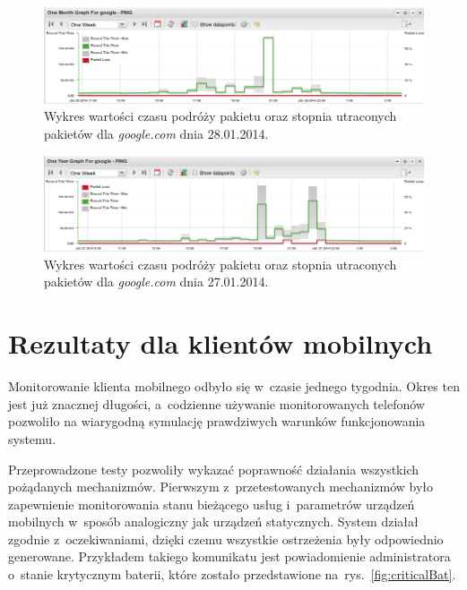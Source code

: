 \begin{figure}[H]
  \caption{Wykres wartości czasu podróży pakietu oraz stopnia
    utraconych pakietów dla {\em google.com} dnia 28.01.2014.}
  \label{fig:google2801}
  \centering
\includegraphics[width=1\textwidth]{img/google2801.png}
\end{figure}

\begin{figure}[H]
  \caption{Wykres wartości czasu podróży pakietu oraz stopnia
    utraconych pakietów dla {\em google.com} dnia 27.01.2014.}
  \label{fig:google2701}
  \centering
\includegraphics[width=1\textwidth]{img/google2701.png}
\end{figure}


\section[Klient mobilny][Rezultaty dla klientów mobilnych]{Rezultaty dla klientów mobilnych}

Monitorowanie klienta mobilnego odbyło się w~czasie jednego
tygodnia. Okres ten jest już znacznej długości, a~codzienne używanie
monitorowanych telefonów pozwoliło na wiarygodną symulację prawdziwych
warunków funkcjonowania systemu.

Przeprowadzone testy pozwoliły wykazać poprawność działania wszystkich
pożądanych mechanizmów. Pierwszym z~przetestowanych mechanizmów było
zapewnienie monitorowania stanu bieżącego usług i~parametrów urządzeń
mobilnych w~sposób analogiczny jak urządzeń statycznych. System
działał zgodnie z~oczekiwaniami, dzięki czemu wszystkie ostrzeżenia
były odpowiednio generowane. Przykładem takiego komunikatu jest
powiadomienie administratora o~stanie krytycznym baterii, które
zostało przedstawione na~rys.~\ref{fig:criticalBat}.

